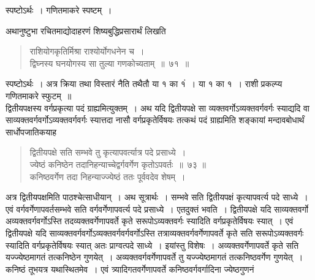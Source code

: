 \documentclass[11pt, openany]{book}
\begin{document}
स्पष्टोऽर्थः~। गणितमाकरे स्पष्टम्~।
\newpage

 अथानुष्टुभा रचितमाद्योदाहरणं शिष्यबुद्धिप्रसारार्थं लिखति\textendash 
\begin{quote}
    \ex
     राशियोगकृतिर्मिश्रा राश्योर्योगधनेन च~। \\
 द्विघ्नस्य घनयोगस्य सा तुल्या गणकोच्यताम्~॥~७१~॥~
\end{quote}

स्पष्टोऽर्थः~। अत्र क्रिया तथा विस्तारं नैति तथैतौ या १ का १ं~। या १ 
का १~। राशी प्रकल्प्य गणितमाकरे स्फुटम्~॥ \\

\vspace{-3mm}
 द्वितीयपक्षस्य वर्गप्रकृत्या पदं ग्राह्यमित्युक्तम्~। अथ यदि द्वितीयपक्षे 
सा व्यक्तवर्गोऽव्यक्तवर्गवर्गः स्याद्यदि वा
साव्यक्तवर्गवर्गोऽव्यक्तवर्गवर्गः स्यात्तदा 
नासौ वर्गप्रकृतेर्विषयः तत्कथं पदं ग्राह्यमिति शङ्कायां मन्दावबोधार्थं
सार्धोपजातिकयाह\textendash 
\begin{quote}
    \bs
 द्वितीयपक्षे सति सम्भवे तु कृत्यापवर्त्यात्र पदे प्रसाध्ये~। \\

\vspace{-5mm}
 ज्येष्ठं कनिष्ठेन तदानिहन्याच्चेद्वर्गवर्गेण कृतोऽपवर्तः~॥~७३
॥ \\
 कनिष्ठवर्गेण तदा निहन्याज्ज्येष्ठं ततः पूर्ववदेव शेषम्~। 
\end{quote}
 
 अत्र द्वितीयपक्षमिति पाठश्चेत्साधीयान्~। अथ सूत्रार्थः~। सम्भवे 
सति द्वितीयपक्षं कृत्यापवर्त्य पदे साध्ये~। एवं वर्गवर्गेणापवर्तसम्भवे
सति वर्गवर्गेणापवर्त्य पदे प्रसाध्ये~। एतदुक्तं भवति~। द्वितीयपक्षे यदि
साव्यक्तवर्गो अव्यक्तवर्गवर्गोऽस्ति तदव्यक्तवर्गेणापवर्ते कृते
सरूपोऽव्यक्तवर्गः स्यादिति वर्गप्रकृतेर्विषयः स्यात्~। एवं द्वितीयपक्षे यदि
साव्यक्तवर्गवर्गोऽव्यक्तवर्गवर्गवर्गोऽस्ति तत्राव्यक्तवर्गवर्गेणापवर्ते कृते सति सरूपोऽव्यक्तवर्गः
स्यादिति वर्गप्रकृतेर्विषयः स्यात् अतः प्राग्वत्पदे साध्ये~। इयांस्तु विशेषः~।
अव्यक्तवर्गेणापवर्ते कृते सति यज्ज्येष्ठमागतं तत्कनिष्ठेन गुणयेत्~।
अव्यक्तवर्गवर्गेणापवर्ते तु यज्ज्येष्ठमागतं तत्कनिष्ठवर्गेण गुणयेत्~। कनिष्ठं तूभयत्र
यथास्थितमेव~। एवं त्र्यादिगतवर्गेणापवर्ते कनिष्ठवर्गवर्गादिना ज्येष्ठगुणनं
\newpage
\end{document}
